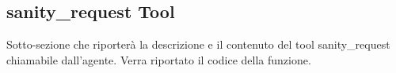 \subsection{sanity\_request Tool}

Sotto-sezione che riporterà la descrizione e il contenuto del tool sanity\_request chiamabile dall'agente.
Verra riportato il codice della funzione.